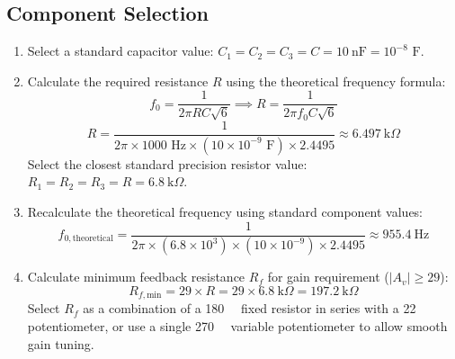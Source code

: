 \subsection{Component Selection}
\begin{enumerate}
	\item Select a standard capacitor value: $C_1=C_2=C_3=C = \SI{10}{\nano\farad} = 10^{-8}\text{ F}$.
	\item Calculate the required resistance $R$ using the theoretical frequency formula:
	\begin{equation}
		f_0 = \frac{1}{2\pi R C \sqrt{6}} \implies R = \frac{1}{2\pi f_0 C \sqrt{6}}
	\end{equation}
	\begin{equation}
		R = \frac{1}{2\pi \times 1000\text{ Hz} \times (10 \times 10^{-9}\text{ F}) \times 2.4495} \approx \SI{6.497}{\kilo\Omega}
	\end{equation}
	Select the closest standard precision resistor value: $R_1 = R_2 = R_3 = R = \SI{6.8}{\kilo\Omega}$.
	
	\item Recalculate the theoretical frequency using standard component values:
	\begin{equation}
		f_{0,\text{theoretical}} = \frac{1}{2\pi \times (6.8 \times 10^3) \times (10 \times 10^{-9}) \times 2.4495} \approx \SI{955.4}{\text{Hz}}
	\end{equation}
	
	\item Calculate minimum feedback resistance $R_f$ for gain requirement ($|A_v| \ge 29$):
	\begin{equation}
		R_{f,\text{min}} = 29 \times R = 29 \times \SI{6.8}{\kilo\Omega} = \SI{197.2}{\kilo\Omega}
	\end{equation}
	Select $R_f$ as a combination of a \SI{180}{\kilo\Omega} fixed resistor in series with a \SI{22}{\kilo\Omega} potentiometer, or use a single \SI{270}{\kilo\Omega} variable potentiometer to allow smooth gain tuning.
\end{enumerate}

